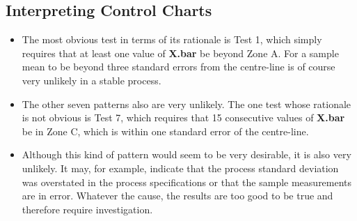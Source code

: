 \documentclass[]{report}
\begin{document}
{\subsection{Interpreting Control Charts}
\begin{itemize}
\item The most obvious test in terms of its rationale is Test 1, which simply requires that at
least one value of \textbf{X.bar} be beyond Zone A. For a sample mean to be beyond three
standard errors from the centre-line is of course very unlikely in a stable process.
\item The other seven patterns also are very unlikely.
The one test whose rationale is not obvious is Test 7, which requires that 15
consecutive values of \textbf{X.bar} be in Zone C, which is within one standard error of the
centre-line.
\item Although this kind of pattern would seem to be very desirable, it is also very unlikely.
It may, for example, indicate that the process standard deviation was overstated in
the process specifications or that the sample measurements are in error. Whatever
the cause, the results are too good to be true and therefore require investigation.
\end{itemize}



}
\end{document}

